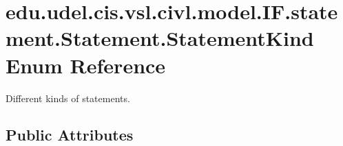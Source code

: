 \hypertarget{enumedu_1_1udel_1_1cis_1_1vsl_1_1civl_1_1model_1_1IF_1_1statement_1_1Statement_1_1StatementKind}{}\section{edu.\+udel.\+cis.\+vsl.\+civl.\+model.\+I\+F.\+statement.\+Statement.\+Statement\+Kind Enum Reference}
\label{enumedu_1_1udel_1_1cis_1_1vsl_1_1civl_1_1model_1_1IF_1_1statement_1_1Statement_1_1StatementKind}


Different kinds of statements.  


\subsection*{Public Attributes}
